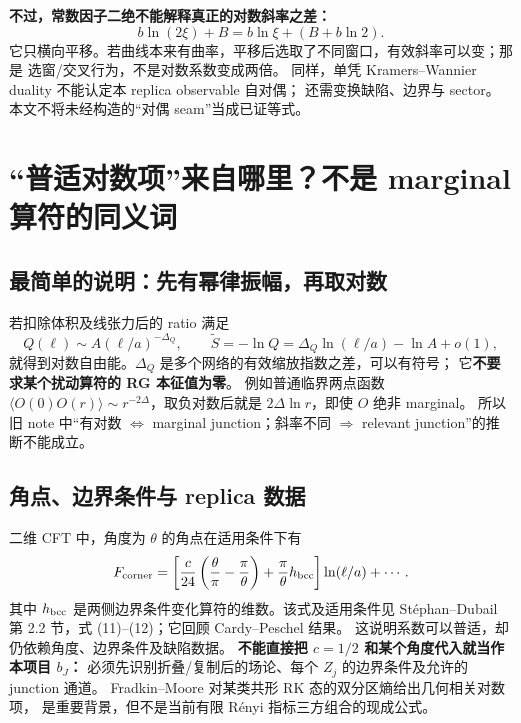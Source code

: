 \documentclass[11pt]{article}
\newcommand{\tS}{\widetilde S}
\begin{document}
\textbf{不过，常数因子二绝不能解释真正的对数斜率之差：}
\begin{equation}
 b\ln(2\xi)+B=b\ln\xi+(B+b\ln2).
\end{equation}
它只横向平移。若曲线本来有曲率，平移后选取了不同窗口，有效斜率可以变；那是
选窗/交叉行为，不是对数系数变成两倍。
同样，单凭 Kramers--Wannier duality 不能认定本 replica observable 自对偶；
还需变换缺陷、边界与 sector。本文不将未经构造的“对偶 seam”当成已证等式。

\section{“普适对数项”来自哪里？不是 marginal 算符的同义词}
\subsection{最简单的说明：先有幂律振幅，再取对数}
若扣除体积及线张力后的 ratio 满足
\begin{equation}
 Q(\ell)\sim A(\ell/a)^{-\Delta_Q},
 \qquad \tS=-\ln Q=\Delta_Q\ln(\ell/a)-\ln A+o(1),\label{eq:log}
\end{equation}
就得到对数自由能。$\Delta_Q$ 是多个网络的有效缩放指数之差，可以有符号；
它\textbf{不要求某个扰动算符的 RG 本征值为零}。
例如普通临界两点函数 $\langle O(0)O(r)\rangle\sim r^{-2\Delta}$，取负对数后就是
$2\Delta\ln r$，即使 $O$ 绝非 marginal。
所以旧 note 中“有对数 $\Leftrightarrow$ marginal junction；斜率不同
$\Rightarrow$ relevant junction”的推断不能成立。

\subsection{角点、边界条件与 replica 数据}
二维 CFT 中，角度为 $\theta$ 的角点在适用条件下有
\begin{equation}
 F_{\rm corner}=\left[\frac{c}{24}\left(\frac\theta\pi-\frac\pi\theta\right)
 +\frac\pi\theta h_{\rm bcc}\right]\ln(\ell/a)+\cdots.\label{eq:corner}
\end{equation}
其中 $h_{\rm bcc}$ 是两侧边界条件变化算符的维数。该式及适用条件见
Stéphan--Dubail 第 2.2 节，式 (11)--(12)\cite{SD}；它回顾 Cardy--Peschel 结果。
这说明系数可以普适，却仍依赖角度、边界条件及缺陷数据。
\textbf{不能直接把 $c=1/2$ 和某个角度代入就当作本项目 $b_J$：}
必须先识别折叠/复制后的场论、每个 $Z_j$ 的边界条件及允许的 junction 通道。
Fradkin--Moore 对某类共形 RK 态的双分区熵给出几何相关对数项\cite{FM}，
是重要背景，但不是当前有限 Rényi 指标三方组合的现成公式。
\end{document}
